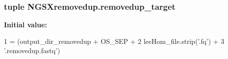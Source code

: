 \subsubsection[{\texorpdfstring{removedup\+\_\+target}{removedup_target}}]{\setlength{\rightskip}{0pt plus 5cm}tuple N\+G\+S\+Xremovedup.\+removedup\+\_\+target}\hypertarget{namespaceNGSXremovedup_a37cf1af2264674a84868f93aa220fe9b}{}\label{namespaceNGSXremovedup_a37cf1af2264674a84868f93aa220fe9b}
{\bfseries Initial value\+:}
\begin{DoxyCode}
1 = (output\_dir\_removedup + OS\_SEP +
2                                 leeHom\_file.strip(\textcolor{stringliteral}{'.fq'}) +
3                                 \textcolor{stringliteral}{'.removedup.fastq'})
\end{DoxyCode}
